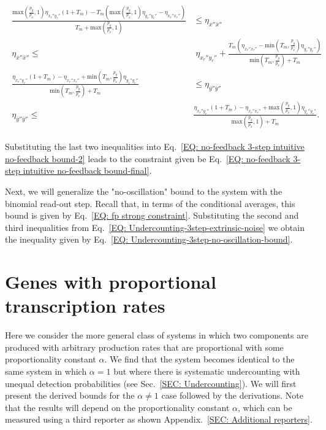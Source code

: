 \documentclass[%
 reprint,prx,
superscriptaddress,
%
%
%
%
%
%
%
%
%
 amsmath,amssymb,
 aps,
%
%
%
%
%
%
]{revtex4-2}
\begin{document}
{{\begin{widetext}
\begin{align}
\begin{split}
    \frac{\text{max}(\frac{p_{y}}{p_{x}},1)\eta_{x_{r}''y_{r}''}(1+T_{m}) - T_{m}\left(\text{max}(\frac{p_{y}}{p_{x}},1)\eta_{y_{r}''y_{r}''} - \eta_{x_{r}''x_{r}''}\right)}{T_{m} + \text{max}(\frac{p_{y}}{p_{x}},1)} &\leq \eta_{\bar{x}''\bar{x}''} \\
    \eta_{\bar{x}''\bar{x}''} \leq& \; \eta_{x_{r}''y_{r}''} + \frac{T_{m}\left(\eta_{x_{r}''x_{r}''} - \text{min}(T_{m},\frac{p_{y}}{p_{x}})\eta_{y_{r}''y_{r}''}\right)}{\text{min}(T_{m},\frac{p_{y}}{p_{x}}) + T_{m}} \\
    \frac{\eta_{x_{r}''y_{r}''}(1+T_{m}) - \eta_{x_{r}''x_{r}''} + \text{min}\left(T_{m},\frac{p_{y}}{p_{x}}\right)\eta_{y_{r}''y_{r}''}}{\text{min}\left(T_{m}, \frac{p_{y}}{p_{x}}\right) + T_{m}} &\leq \eta_{\bar{y}''\bar{y}''} \\
    \eta_{\bar{y}''\bar{y}''} \leq& \frac{\eta_{x_{r}''y_{r}''}\left(1+T_{m}\right) - \eta_{x_{r}''x_{r}''} + \text{max}\left(\frac{p_{y}}{p_{x}},1\right)\eta_{y_{r}''y_{r}''}}{\text{max}\left(\frac{p_{y}}{p_{x}},1\right) + T_{m}} .
    \end{split}
    \label{EQ: Undercounting-3step-extrinsic-noise}
\end{align}
\end{widetext}
Substituting the last two inequalities into Eq.~\eqref{EQ: no-feedback 3-step intuitive no-feedback bound-2} leads to the constraint given be Eq.~\eqref{EQ: no-feedback 3-step intuitive no-feedback bound-final}. 

Next, we will generalize the "no-oscillation" bound to the system with the binomial read-out step. Recall that, in terms of the conditional averages, this bound is given by Eq.~\eqref{EQ: fp strong constraint}. Substituting the second and third inequalities from Eq.~\eqref{EQ: Undercounting-3step-extrinsic-noise} we obtain the inequality given by Eq.~\eqref{EQ: Undercounting-3step-no-oscillation-bound}. 



\section{Genes with proportional transcription rates}
\label{SEC: Proportional rates}
Here we consider the more general class of systems in which two components are produced with arbitrary production rates that are proportional with some proportionality 
constant $\alpha$. 
We find that the system becomes identical to the same system in which $\alpha = 1$ but where there is systematic undercounting with unequal detection probabilities (see Sec.~\ref{SEC: Undercounting}). We will first present the derived bounds for the $\alpha \neq 1$ case followed by the derivations. Note that the results will depend on the proportionality constant $\alpha$, which can be measured using a third reporter as shown Appendix.~\ref{SEC: Additional reporters}. 

}}
\end{document}
